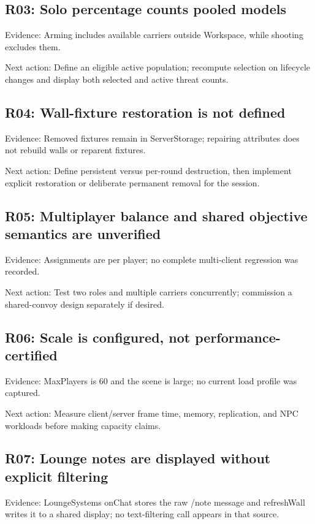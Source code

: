 \subsection{R03: Solo percentage counts pooled models}
Evidence: Arming includes available carriers outside Workspace, while shooting excludes them.\allowbreak{}

Next action: Define an eligible active population; recompute selection on lifecycle changes and display both selected and active threat counts.\allowbreak{}

\subsection{R04: Wall-fixture restoration is not defined}
Evidence: Removed fixtures remain in ServerStorage; repairing attributes does not rebuild walls or reparent fixtures.\allowbreak{}

Next action: Define persistent versus per-round destruction, then implement explicit restoration or deliberate permanent removal for the session.\allowbreak{}

\subsection{R05: Multiplayer balance and shared objective semantics are unverified}
Evidence: Assignments are per player; no complete multi-client regression was recorded.\allowbreak{}

Next action: Test two roles and multiple carriers concurrently; commission a shared-convoy design separately if desired.\allowbreak{}

\subsection{R06: Scale is configured, not performance-certified}
Evidence: MaxPlayers is 60 and the scene is large; no current load profile was captured.\allowbreak{}

Next action: Measure client/\allowbreak{}server frame time, memory, replication, and NPC workloads before making capacity claims.\allowbreak{}

\subsection{R07: Lounge notes are displayed without explicit filtering}
Evidence: LoungeSystems onChat stores the raw /\allowbreak{}note message and refreshWall writes it to a shared display; no text-filtering call appears in that source.\allowbreak{}


